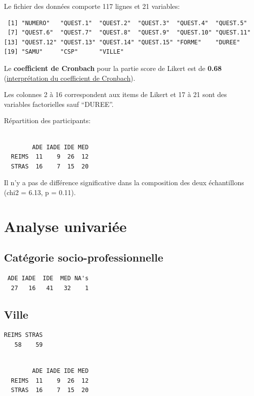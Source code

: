 \documentclass[]{article}
\begin{document}
Le fichier des données comporte 117 lignes et 21 variables:

\begin{verbatim}
 [1] "NUMERO"   "QUEST.1"  "QUEST.2"  "QUEST.3"  "QUEST.4"  "QUEST.5" 
 [7] "QUEST.6"  "QUEST.7"  "QUEST.8"  "QUEST.9"  "QUEST.10" "QUEST.11"
[13] "QUEST.12" "QUEST.13" "QUEST.14" "QUEST.15" "FORME"    "DUREE"   
[19] "SAMU"     "CSP"      "VILLE"   
\end{verbatim}

Le \textbf{coefficient de Cronbach} pour la partie score de Likert est
de \textbf{0.68}
(\href{http://www.wikiwand.com/en/Cronbach's_alpha}{interprétation du
coefficient de Cronbach}).

Les colonnes 2 à 16 correspondent aux items de Likert et 17 à 21 sont
des variables factorielles sauf ``DUREE''.

Répartition des participants:

\begin{verbatim}
       
        ADE IADE IDE MED
  REIMS  11    9  26  12
  STRAS  16    7  15  20
\end{verbatim}

Il n'y a pas de différence significative dans la composition des deux
échantillons (chi2 = 6.13, p = 0.11).

\section{Analyse univariée}\label{analyse-univariee}

\subsection{Catégorie
socio-professionnelle}\label{categorie-socio-professionnelle}

\begin{verbatim}
 ADE IADE  IDE  MED NA's 
  27   16   41   32    1 
\end{verbatim}

\subsection{Ville}\label{ville}

\begin{verbatim}
REIMS STRAS 
   58    59 
\end{verbatim}

\begin{verbatim}
       
        ADE IADE IDE MED
  REIMS  11    9  26  12
  STRAS  16    7  15  20
\end{verbatim}
\end{document}
